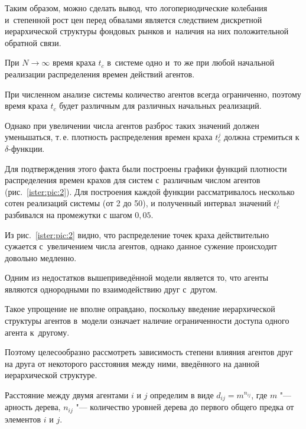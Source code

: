 Таким образом, можно сделать вывод, что логопериодические колебания и~степенной рост цен перед обвалами является следствием дискретной иерархической структуры фондовых рынков и~наличия на них положительной обратной связи.



При $N\to \infty $ время краха $t_c  $ в~системе одно и~то же при любой начальной реализации распределения времен действий агентов.

При численном анализе системы количество агентов всегда ограниченно, поэтому время краха $t_c$ будет различным для различных начальных реализаций.

Однако при увеличении числа агентов разброс таких значений должен уменьшаться, т.\,е. плотность распределения времен краха $t_c  ^{j} $ должна стремиться к $\delta$-функции.

Для подтверждения этого факта были построены графики функций плотности распределения времен крахов для систем с~различным числом агентов (рис.~\ref{ister:pic:2}). Для построения каждой функции рассматривалось несколько сотен реализаций системы (от 2 до 50), и полученный интервал значений $t_c  ^{j} $ разбивался на промежутки с шагом $0,05$.









Из рис.~\ref{ister:pic:2} видно, что распределение точек краха действительно сужается с~увеличением числа агентов, однако данное сужение происходит довольно медленно.







\smallskip 


Одним из недостатков вышеприведённой модели является то, что агенты являются однородными по взаимодействию друг с~другом.

Такое упрощение не вполне оправдано, поскольку введение иерархической структуры агентов в~модели означает наличие ограниченности доступа одного агента к~другому.

Поэтому целесообразно рассмотреть зависимость степени влияния агентов друг на друга от некоторого расстояния между ними, введённого на данной иерархической структуре.





Расстояние между двумя агентами $i$ и $j$ определим в виде $d_{ij} =m^{n_{ij}} $, где $m$ "--- арность дерева, $n_{ij}$ "--- количество уровней дерева до первого общего предка от элементов $i$ и $j$.

